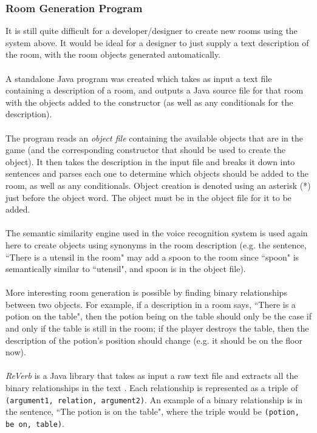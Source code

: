 \documentclass[11pt]{article}
\begin{document}
\subsubsection{Room Generation Program}

It is still quite difficult for a developer/designer to create new rooms using the system above. It would be ideal for a designer to just supply a text description of the room, with the room objects generated automatically.
\\
\\
A standalone Java program was created which takes as input a text file containing a description of a room, and outputs a Java source file for that room with the objects added to the constructor (as well as any conditionals for the description).
\\
\\
The program reads an \textit{object file} containing the available objects that are in the game (and the corresponding constructor that should be used to create the object). It then takes the description in the input file and breaks it down into sentences and parses each one to determine which objects should be added to the room, as well as any conditionals. Object creation is denoted using an asterisk (*) just before the object word. The object must be in the object file for it to be added.
\\
\\
The semantic similarity engine used in the voice recognition system is used again here to create objects using synonyms in the room description (e.g. the sentence, ``There is a utensil in the room" may add a spoon to the room since ``spoon" is semantically similar to ``utensil", and spoon is in the object file).
\\
\\
More interesting room generation is possible by finding binary relationships between two objects. For example, if a description in a room says, ``There is a potion on the table", then the potion being on the table should only be the case if and only if the table is still in the room; if the player destroys the table, then the description of the potion's position should change (e.g. it should be on the floor now).
\\
\\
\textit{ReVerb} is a Java library that takes as input a raw text file and extracts all the binary relationships in the text \cite{ReVerb2011}. Each relationship is represented as a triple of \texttt{(argument1, relation, argument2)}. An example of a binary relationship is in the sentence, ``The potion is on the table", where the triple would be \texttt{(potion, be on, table)}.
\end{document}
